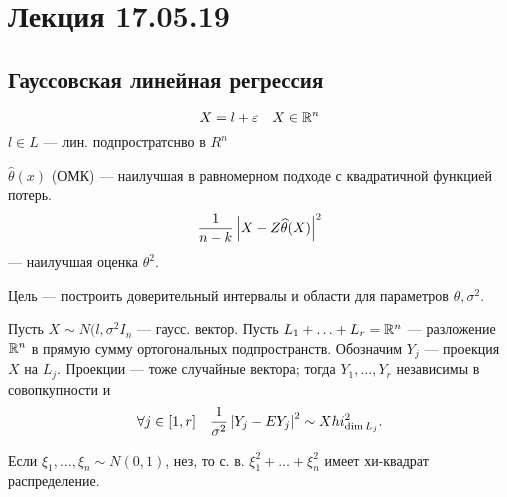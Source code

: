 \section{Лекция 17.05.19}

\subsection{Гауссовская линейная регрессия}

\begin{definition}
    \begin{displaymath}
        X = l + \varepsilon \quad X \in \mathbb{R}^n
    \end{displaymath}
    \(l \in L\) --- лин. подпростратснво в \(R^n\)
\end{definition}

\begin{theorem}
    \(\widehat{\theta}(x)\) (ОМК) --- наилучшая в равномерном подходе с квадратичной функцией потерь.
    \begin{displaymath}
        \frac{1}{n - k} \left|X - Z \widehat{\theta}(X)\right|^2
    \end{displaymath} --- наилучшая оценка \(\theta^2\).
\end{theorem}

Цель --- построить доверительный интервалы и области для параметров \(\theta, \sigma^2\).

\begin{theorem}
    Пусть \(X \sim N(l, \sigma^2 I_n\) --- гаусс. вектор. Пусть \(L_1 + \ldots + L_r = \mathbb{R}^n\) --- разложение \(\mathbb{R}^n\) в прямую сумму ортогональных подпространств. Обозначим \(Y_j\) --- проекция \(X\) на \(L_j\). Проекции --- тоже случайные вектора; тогда \(Y_1, \ldots, Y_r\) независимы в совопкупности и
    \begin{displaymath}
        \forall j \in [1, r] \quad \frac{1}{\sigma^2} \left|Y_j - E Y_j\right|^2 \sim Xhi^2_{\dim L_j}.
    \end{displaymath}
\end{theorem}

\begin{definition}
    Если \(\xi_1, \ldots, \xi_n \sim N(0, 1)\), нез, то с. в. \(\xi_1^2 + \ldots + \xi_n^2\) имеет хи-квадрат распределение.
\end{definition}

